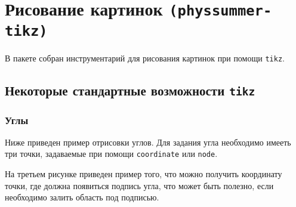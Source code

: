 \section{Рисование картинок \texttt{(physsummer-tikz)}}

В пакете собран инструментарий для рисования картинок при помощи \texttt{tikz}.

\subsection{Некоторые стандартные возможности \texttt{tikz}}

\subsubsection{Углы}

Ниже приведен пример отрисовки углов. Для задания угла необходимо имееть три точки, задаваемые при помощи
\texttt{coordinate} или \texttt{node}.

На третьем рисунке приведен пример того, что можно получить координату точки, где должна появиться
подпись угла, что может быть полезно, если необходимо залить область под подписью.

